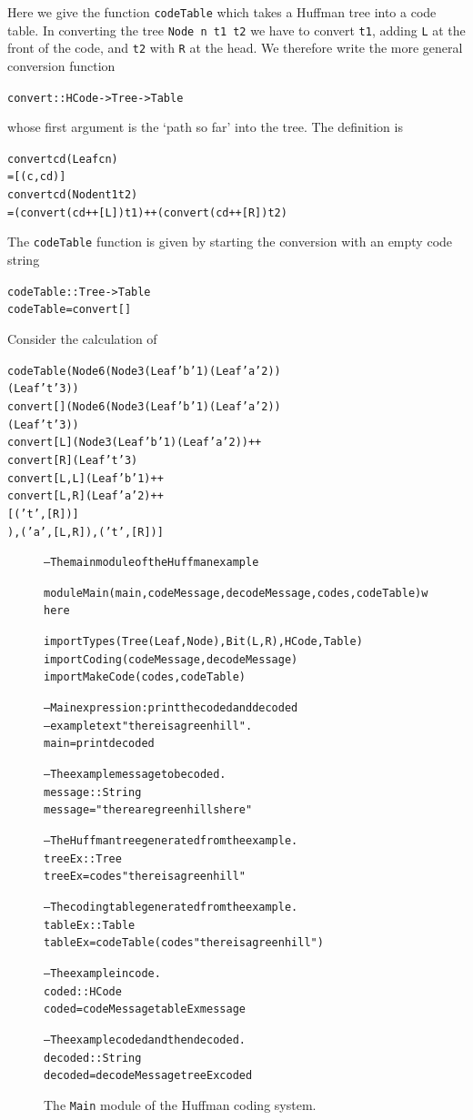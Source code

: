 Here we give the function \texttt{codeTable} which takes a Huffman tree into a
code table. In converting the tree \texttt{Node n t1 t2} we have to convert 
\texttt{t1}, adding \texttt{L} at the front of the code, and \texttt{t2} with \texttt{R} at
the head. We therefore write the more general conversion function
\begin{alltt}
convert :: HCode -> Tree -> Table
\end{alltt}
whose first argument is the `path so far' into the tree. The definition is
\begin{alltt}
convert cd (Leaf c n) 
      =  [(c,cd)]
convert cd (Node n t1 t2)
      = (convert (cd++[L]) t1) ++ (convert (cd++[R]) t2)
\end{alltt}
The \texttt{codeTable} function is given by starting the conversion with an
empty code string
\begin{alltt}
codeTable :: Tree -> Table
codeTable = convert []
\end{alltt}
Consider the calculation of
\begin{alltt}
codeTable (Node 6 (Node 3 (Leaf 'b' 1) (Leaf 'a' 2)) 
                  (Leaf 't' 3))
\step convert [] (Node 6 (Node 3 (Leaf 'b' 1) (Leaf 'a' 2)) 
                       (Leaf 't' 3))
\step convert [L] (Node 3 (Leaf 'b' 1) (Leaf 'a' 2)) ++
    convert [R] (Leaf 't' 3)
\step convert [L,L] (Leaf 'b' 1) ++ 
    convert [L,R] (Leaf 'a' 2) ++ 
    [ ('t',[R]) ]
\step [ ('b',[L,L]) , ('a',[L,R]) , ('t',[R]) ]
\end{alltt}

\begin{figure}[t]
\begin{center}
\begin{alltt}
-- The main module of the Huffman example

module Main (main, codeMessage, decodeMessage, codes, codeTable ) where

import Types    ( Tree(Leaf,Node), Bit(L,R), HCode , Table )
import Coding   ( codeMessage, decodeMessage ) 
import MakeCode ( codes, codeTable )

-- Main expression: print the coded and decoded 
-- example text "there is a green hill".
main = print decoded

-- The example message to be coded.
message :: String
message = "there are green hills here"

-- The Huffman tree generated from the example.
treeEx :: Tree
treeEx = codes "there is a green hill"

-- The coding table generated from the example.					
tableEx :: Table
tableEx = codeTable (codes "there is a green hill")

-- The example in code.
coded :: HCode
coded = codeMessage tableEx message

-- The example coded and then decoded.
decoded :: String
decoded = decodeMessage treeEx coded
\end{alltt}
\end{center}
\caption{The \texttt{Main} module of the Huffman coding system.}
\label{mainMod}
\end{figure}


